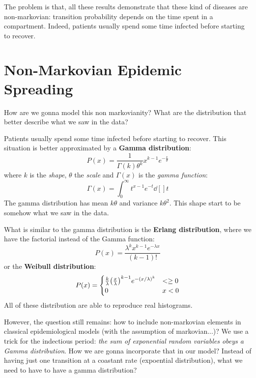 \documentclass[../main/main.tex]{subfiles}
\begin{document}
The problem is that, all these results demonstrate that these kind of diseases are non-markovian: transition probability depends on the time spent in a compartment. Indeed, patients usually spend some time infected before starting to recover.




\section{Non-Markovian Epidemic Spreading}

How are we gonna model this non markovianity?
What are the distribution that better describe what we saw in the data?

Patients usually spend some time infected before starting to recover. This situation is better approximated by a \textbf{Gamma distribution}:
\begin{equation}
  P(x) = \frac{1}{\Gamma (k) \theta ^k} x^{k-1} e^{- \frac{x}{\theta }}
\end{equation}
where \( k \) is the \emph{shape}, \( \theta  \) the \emph{scale} and   \( \Gamma (x) \) is the \emph{gamma function}:
\begin{equation*}
  \Gamma (x) = \int_{0}^{\infty } t^{x-1} e^{-t} \dd[]{t}
\end{equation*}
The gamma distribution has mean \( k \theta  \) and variance \( k \theta ^2 \).
This shape start to be somehow what we saw in the data.

What is similar to the gamma distribution is the \textbf{Erlang distribution}, where we have the factorial instead of the Gamma function:
\begin{equation}
  P (x) = \frac{\lambda ^k x^{k-1}e^{- \lambda x} }{(k-1)!}
\end{equation}
or the \textbf{Weibull distribution}:
  \begin{equation}
  P(x) =
    \begin{cases}
     \frac{k}{\lambda } \qty(\frac{x}{\lambda })^{k-1} e^{- (x/\lambda )^k} & < \ge 0  \\
    0 & x <0
    \end{cases}
  \end{equation}
All of these distribution are able to reproduce real histograms.

However, the question still remains: how to include non-markovian elements in classical epidemiological models (with the assumption of markovian...)?
We use a trick for the indectious period: \emph{the sum of exponential random variables obeys a Gamma distribution}.
How we are gonna incorporate that in our model? Instead of having just one transition at a coastant rate (expoential distribution), what we need to have to have a gamma distribution?
\end{document}
